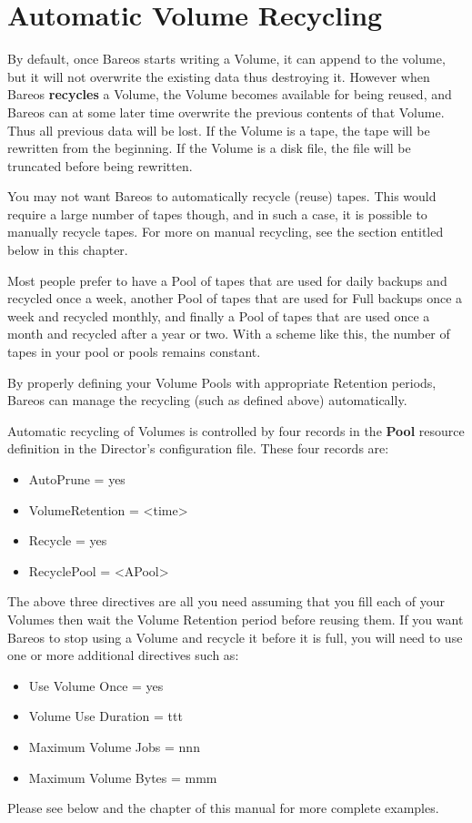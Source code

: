 
\section{Automatic Volume Recycling}
\label{RecyclingChapter}

By default, once Bareos starts writing a Volume, it can append to the
volume, but it will not overwrite the existing data thus destroying it.
However when Bareos {\bf recycles} a Volume, the Volume becomes available
for being reused, and Bareos can at some later time overwrite the previous
contents of that Volume.  Thus all previous data will be lost.  If the
Volume is a tape, the tape will be rewritten from the beginning.  If the
Volume is a disk file, the file will be truncated before being rewritten.

You may not want Bareos to automatically recycle (reuse) tapes.  This would
require a large number of tapes though, and in such a case, it is possible
to manually recycle tapes.  For more on manual recycling, see the section
entitled  below in this
chapter.

Most people prefer to have a Pool of tapes that are used for daily backups and
recycled once a week, another Pool of tapes that are used for Full backups
once a week and recycled monthly, and finally a Pool of tapes that are used
once a month and recycled after a year or two. With a scheme like this, the
number of tapes in your pool or pools remains constant.

By properly defining your Volume Pools with appropriate Retention periods,
Bareos can manage the recycling (such as defined above) automatically.

Automatic recycling of Volumes is controlled by four records in the {\bf
Pool} resource definition in the Director's configuration file. These four
records are:

\begin{itemize}
\item AutoPrune = yes
\item VolumeRetention = {\textless}time{\textgreater}
\item Recycle = yes
\item RecyclePool = {\textless}APool{\textgreater}
\end{itemize}

The above three directives are all you need assuming that you fill
each of your Volumes then wait the Volume Retention period before
reusing them.  If you want Bareos to stop using a Volume and recycle
it before it is full, you will need to use one or more additional
directives such as:
\begin{itemize}
\item Use Volume Once = yes
\item Volume Use Duration = ttt
\item Maximum Volume Jobs = nnn
\item Maximum Volume Bytes = mmm
\end{itemize}
Please see below and
the  chapter
of this manual for more complete examples.

